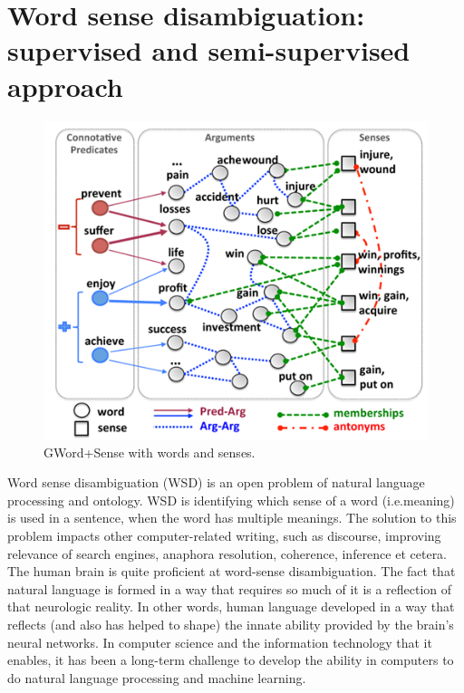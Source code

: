 \section*{Word sense disambiguation: supervised and semi-supervised approach}
\begin{figure}[tbh]
	\begin{center}
		\includegraphics[width=\columnwidth]{union(WSD)}
	\end{center}
	\caption{GWord+Sense with words and senses. \label{fig}}
\end{figure}
Word sense disambiguation (WSD) is an open problem of natural language processing and ontology. WSD is identifying which sense of a word (i.e.meaning) is used in a sentence, when the word has multiple meanings. The solution to this problem impacts other computer-related writing, such as discourse, improving relevance of search engines, anaphora resolution, coherence, inference et cetera.
The human brain is quite proficient at word-sense disambiguation. The fact that natural language is formed in a way that requires so much of it is a reflection of that neurologic reality. In other words, human language developed in a way that reflects (and also has helped to shape) the innate ability provided by the brain's neural networks. In computer science and the information technology that it enables, it has been a long-term challenge to develop the ability in computers to do natural language processing and machine learning.
